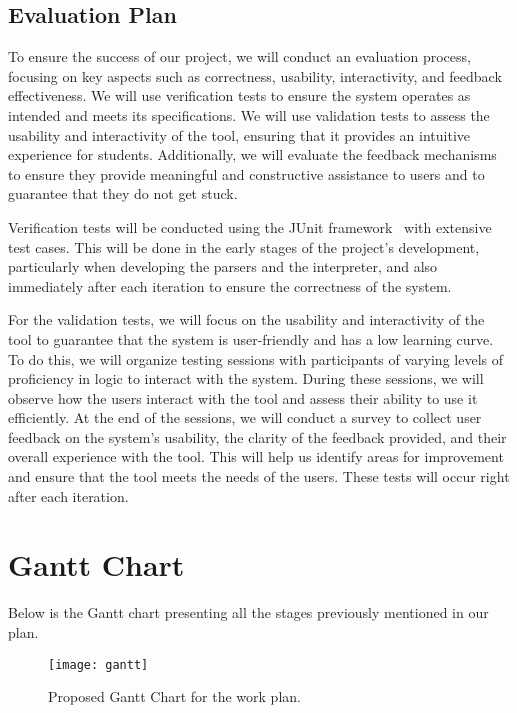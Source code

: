 \subsection{Evaluation Plan}
To ensure the success of our project, we will conduct an evaluation process, focusing on key aspects such as correctness, usability, interactivity, and feedback effectiveness. We will use verification tests to ensure the system operates as intended and meets its specifications. We will use validation tests to assess the usability and interactivity of the tool, ensuring that it provides an intuitive experience for students. Additionally, we will evaluate the feedback mechanisms to ensure they provide meaningful and constructive assistance to users and to guarantee that they do not get stuck.

Verification tests will be conducted using the JUnit framework~\cite{junit_2018_junit} with extensive test cases. This will be done in the early stages of the project’s development, particularly when developing the parsers and the interpreter, and also immediately after each iteration to ensure the correctness of the system.

For the validation tests, we will focus on the usability and interactivity of the tool to guarantee that the system is user-friendly and has a low learning curve. To do this, we will organize testing sessions with participants of varying levels of proficiency in logic to interact with the system. During these sessions, we will observe how the users interact with the tool and assess their ability to use it efficiently. At the end of the sessions, we will conduct a survey to collect user feedback on the system’s usability, the clarity of the feedback provided, and their overall experience with the tool. This will help us identify areas for improvement and ensure that the tool meets the needs of the users. These tests will occur right after each iteration.


\section{Gantt Chart}
Below is the Gantt chart presenting all the stages previously mentioned in our plan.
\begin{figure}[htbp]
    \centering
    \texttt{[image: gantt]}
    \caption{Proposed Gantt Chart for the work plan.}
    \label{img:gantt}
\end{figure}